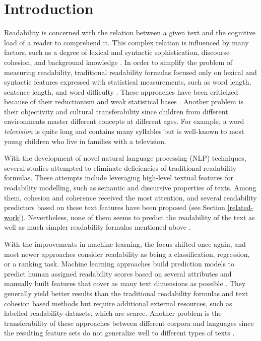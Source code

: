 \documentclass{clv3}
\begin{document}
\section{Introduction}
\label{sec-intro}


Readability is concerned with the relation between a given text and the cognitive load of a reader to comprehend it. This complex relation is influenced by many factors, such as a degree of lexical and syntactic sophistication, discourse cohesion, and background knowledge \citep{crossley2017predicting}. In order to simplify the problem of measuring readability, traditional readability formulas focused only on lexical and syntactic features expressed with statistical measurements, such as word length, sentence length, and word difficulty \citep{davison1982failure}. These approaches have been criticized because of their reductionism and weak statistical bases \citep{crossley2017predicting}. Another problem is their objectivity and cultural transferability since children from different environments master different concepts at different ages. For example, a word \textit{television} is quite long and contains many syllables but is well-known to most young children who live in families with a television.

With the development of novel natural language processing (NLP) techniques, several studies attempted to eliminate deficiencies of traditional readability formulas. These attempts include leveraging high-level textual features for readability modelling, such as semantic and discursive properties of texts. Among them, cohesion and coherence received the most attention, and several readability predictors based on these text features have been proposed (see Section \ref{related-work}). Nevertheless, none of them seems to predict the readability of the text as well as much simpler readability formulas mentioned above \cite{todirascu-etal-2016-cohesive}.

With the improvements in machine learning, the focus shifted once again, and most newer approaches consider readability as being a classification, regression, or a ranking task. Machine learning approaches build prediction models to predict human assigned readability scores based on several attributes and manually built features that cover as many text dimensions as possible \citep{schwarm2005reading, vajjala2012improving, petersen2009machine}. They generally yield better results than the traditional readability formulas and text cohesion based methods but require additional external resources, such as labelled readability datasets, which are scarce. Another problem is the transferability of these approaches between  different corpora and languages since the resulting feature sets do not generalize
well to different types of texts \cite{filighera2019automatic, xia2016text}.
\end{document}
